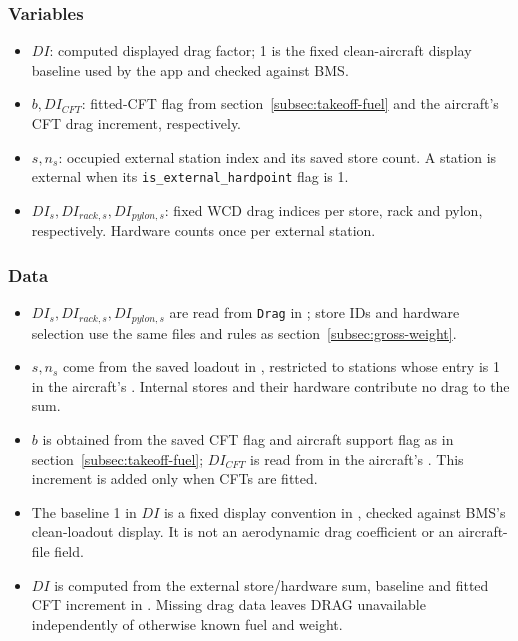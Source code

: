 \documentclass[10pt,a4paper]{amsart}
\begin{document}
\subsubsection*{Variables}
\begin{itemize}
\setlength{\itemsep}{0pt}
\setlength{\parsep}{0pt}
\item $DI$: computed displayed drag factor; 1 is the fixed clean-aircraft
display baseline used by the app and checked against BMS.
\item $b,DI_{CFT}$: fitted-CFT flag from section~\ref{subsec:takeoff-fuel} and the aircraft's
CFT drag increment, respectively.
\item $s,n_s$: occupied external station index and its saved store count.
A station is external when its \texttt{is\_external\_hardpoint}
flag is 1.
\item $DI_s,DI_{rack,s},DI_{pylon,s}$: fixed WCD drag indices per store,
rack and pylon, respectively. Hardware counts once per external station.
\end{itemize}

\subsubsection*{Data}
\begin{itemize}
\setlength{\itemsep}{0pt}
\setlength{\parsep}{0pt}
\item $DI_s,DI_{rack,s},DI_{pylon,s}$ are read from \texttt{Drag} in
; store IDs and hardware selection
use the same files and rules as section~\ref{subsec:gross-weight}.
\item $s,n_s$ come from the saved loadout in , restricted
to stations whose 
entry is 1 in the aircraft's .
Internal stores and their hardware contribute no drag to the sum.
\item $b$ is obtained from the saved CFT flag and aircraft support flag
as in section~\ref{subsec:takeoff-fuel}; $DI_{CFT}$ is read from 
in the aircraft's . This increment is added
only when CFTs are fitted.
\item The baseline 1 in $DI$ is a fixed display convention in
, checked against
BMS's clean-loadout display. It is not an aerodynamic drag coefficient
or an aircraft-file field.
\item $DI$ is computed from the external store/hardware sum, baseline
and fitted CFT increment in .
Missing drag data leaves DRAG unavailable independently of otherwise
known fuel and weight.
\end{itemize}
\end{document}
